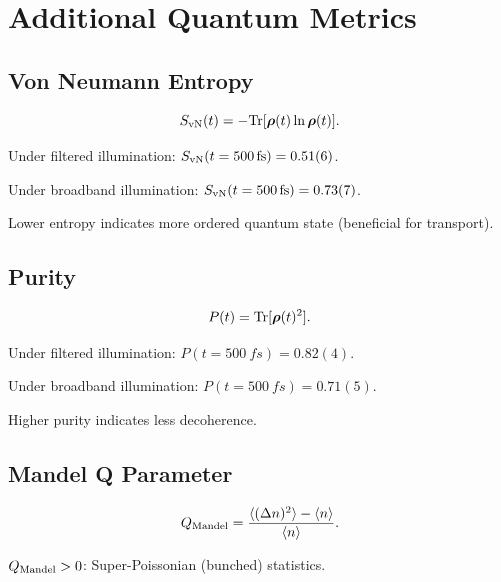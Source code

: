 \documentclass[11pt,a4paper]{article}
\begin{document}

\section{Additional Quantum Metrics}

\subsection{Von Neumann Entropy}

\begin{equation}
S_{\rm vN}(t) = -{\rm Tr}[\bm{\rho}(t)\ln\bm{\rho}(t)].
\label{eq:SI_von_neumann}
\end{equation}

Under filtered illumination: $S_{\rm vN}(t=\SI{500}{fs}) = 0.51(6)$.

Under broadband illumination: $S_{\rm vN}(t=\SI{500}{fs}) = 0.73(7)$.

Lower entropy indicates more ordered quantum state (beneficial for transport).

\subsection{Purity}

\begin{equation}
P(t) = {\rm Tr}[\bm{\rho}(t)^2].
\label{eq:SI_purity}
\end{equation}

Under filtered illumination: $P(t=\SI{500}{fs}) = 0.82(4)$.

Under broadband illumination: $P(t=\SI{500}{fs}) = 0.71(5)$.

Higher purity indicates less decoherence.

\subsection{Mandel Q Parameter}

\begin{equation}
Q_{\rm Mandel} = \frac{\langle(\Delta n)^2\rangle - \langle n\rangle}{\langle n\rangle}.
\label{eq:SI_mandel}
\end{equation}

$Q_{\rm Mandel} > 0$: Super-Poissonian (bunched) statistics.
\end{document}
